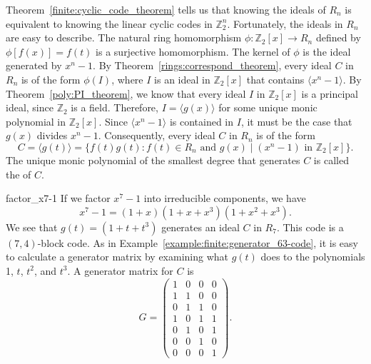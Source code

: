 Theorem~\ref{finite:cyclic_code_theorem} tells us that knowing the ideals of $R_n$ is equivalent to knowing the linear cyclic codes in ${\mathbb Z}_2^n$.  Fortunately, the ideals in $R_n$ are easy to describe.  The  natural ring homomorphism $\phi : {\mathbb Z}_2[x] \rightarrow R_n$ defined by $\phi[f(x)] = f(t)$ is a surjective homomorphism.  The kernel of $\phi$ is the ideal generated by $x^n - 1$.  By Theorem~\ref{rings:correspond_theorem}, every ideal $C$ in $R_n$ is of the form $\phi(I)$, where $I$ is an ideal in ${\mathbb Z}_2[x]$ that contains $\langle x^n - 1 \rangle$.  By Theorem~\ref{poly:PI_theorem}, we know that every ideal $I$ in ${\mathbb Z}_2[x]$ is a principal ideal, since ${\mathbb Z}_2$ is a field. Therefore, $I = \langle g(x) \rangle$ for some unique monic polynomial in ${\mathbb Z}_2[x]$. Since $\langle x^n - 1 \rangle$ is contained in $I$, it must be the case that $g(x)$ divides $x^n - 1$. Consequently, every ideal $C$ in $R_n$ is of the form 
\[
C= \langle g(t) \rangle = \{ f(t)g(t) : f(t) \in R_n \mbox{ and $g(x)
\mid (x^n - 1)$ in } {\mathbb Z}_2[x] \}.
\]
The unique monic polynomial of the smallest degree that generates $C$ is called the  of $C$. 


\begin{example}{factor_x7-1}
If we factor $x^7 - 1$ into irreducible components, we have
\[
x^7 - 1 = (1 + x)(1 + x + x^3)(1+ x^2 + x^3).
\]
We see that $g(t) = (1 + t + t^3)$ generates an ideal $C$ in $R_7$.  This code is a $(7, 4)$-block code.  As in Example~\ref{example:finite:generator_63-code}, it is easy to calculate a generator matrix by examining what $g(t)$ does to the polynomials 1, $t$, $t^2$, and $t^3$.  A generator matrix for $C$ is 
\[
G =
\begin{pmatrix}
1 & 0 & 0 & 0 \\
1 & 1 & 0 & 0 \\
0 & 1 & 1 & 0 \\
1 & 0 & 1 & 1 \\
0 & 1 & 0 & 1 \\
0 & 0 & 1 & 0 \\
0 & 0 & 0 & 1
\end{pmatrix}.
\]
\end{example}

